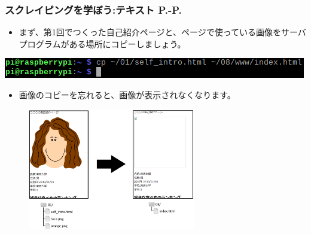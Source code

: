 \documentclass[dvipdfmx]{beamer}
\begin{document}
\begin{frame}[fragile]
	\frametitle{スクレイピングを学ぼう:テキスト P.\pageref{1:P:intro}-P.\pageref{1:P:charCode}~~~}
        \begin{itemize}
            \item まず、第1回でつくった自己紹介ページと、ページで使っている画像をサーバプログラムがある場所にコピーしましょう。
        \end{itemize}
        \begin{minipage}{\textwidth}
            {\upshape
              \includegraphics[width=\textwidth]{textbook-img002.png}}
        \end{minipage}
        \begin{itemize}
            \item 画像のコピーを忘れると、画像が表示されなくなります。
        \end{itemize}
        \begin{figure}
          \centering
          \includegraphics[width=0.65\textwidth]{slide08-img002.png}
        \end{figure}
\end{frame}
\end{document}
